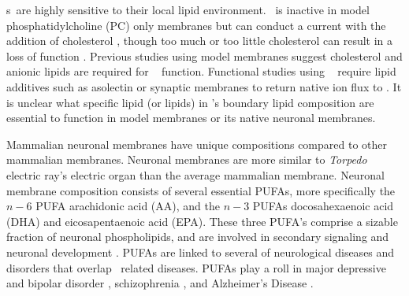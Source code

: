 \nachr s~are highly sensitive to their local lipid environment. \nachr~is inactive in model phosphatidylcholine (PC) only membranes but can conduct a current with the addition of cholesterol \cite{Baenziger2017}, though too much or too little cholesterol can result in a loss of function \cite{M.CriadoH.Eibl1982}.  Previous studies using model membranes suggest cholesterol and anionic lipids \cite{Dalziel1980,Ellena1983,M.CriadoH.Eibl1982,Fong1986,Fong1987,Jones1988,Sunshine1994,DaCosta2009b} are required for \nachr~ function.  Functional studies using \xo~ \cite{Zhou2003,Gamba2005,Chen2015,Kouvatsos2016,Nys2016,Polovinkin2018,Moffett2019,Kumar2020} require lipid additives such as asolectin\cite{M.CriadoH.Eibl1982,Zhou2003,Gamba2005,Chen2015,Kouvatsos2016,Nys2016,Polovinkin2018,Moffett2019,Kumar2020} or synaptic membranes \cite{Conti2013} to return native ion flux to \nachr. It is unclear what specific lipid (or lipids) in \nachr's boundary lipid composition are essential to function in model membranes or its native neuronal membranes.%

Mammalian neuronal membranes \cite{Isolated1969, Taguchi2010, Breckenridge1973,Ingolfsson2017b} have unique compositions compared to other mammalian membranes\cite{McEvoy2000,Kim2001,VanMeer2010,Lorent2020,Ingolfsson2014}. Neuronal membranes are more similar to \textit{Torpedo} electric ray's electric organ \cite{Barrantes1989a,Quesada2016} than the average mammalian membrane\cite{Ingolfsson2014}. Neuronal membrane \cite{Isolated1969, Taguchi2010, Breckenridge1973,Ingolfsson2017b} composition consists of several essential PUFAs, more specifically the $n-6$ PUFA arachidonic acid (AA), and the $n-3$ PUFAs docosahexaenoic acid (DHA) and eicosapentaenoic acid (EPA). These three PUFA's comprise a sizable fraction of neuronal phospholipids, and are involved in secondary signaling \cite{McNamara2008,Hamazaki2015} and neuronal development \cite{Maekawa2017}. PUFAs are linked to several of neurological diseases and disorders that overlap \nachr~related diseases. PUFAs play a roll in major depressive and bipolar disorder \cite{Adibhatla2007,McNamara2008,Schneider2017,Koga2019,Hamazaki2015}, schizophrenia \cite{Peet2003,Bushe2005,Berger2006,Schneider2017,Maekawa2017,Hamazaki2015}, and Alzheimer's Disease \cite{Conquer2000,DiPaolo2011,Bennett2013,Adibhatla2007,Yadav2014,Escriba2017}. %

